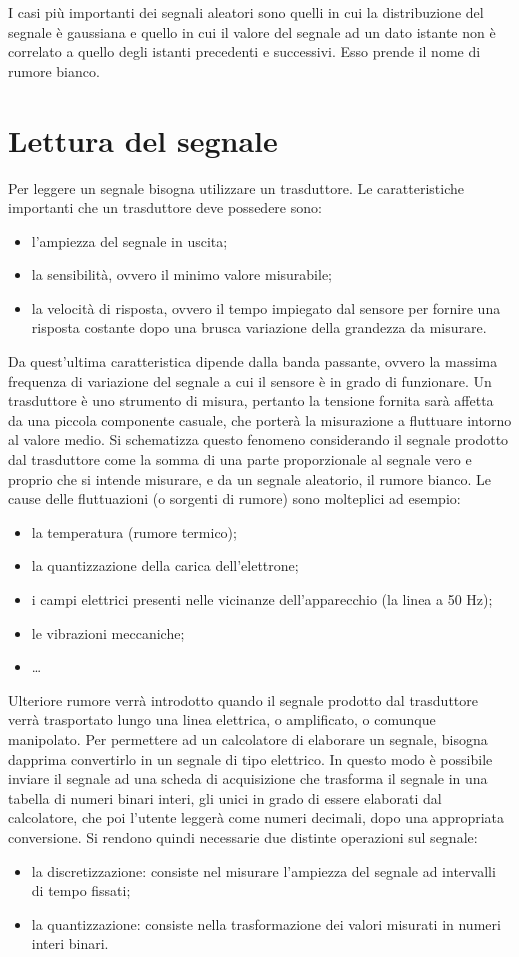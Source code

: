 \documentclass[a4paper,12pt]{article}
\begin{document}
I casi più importanti dei segnali aleatori sono quelli in cui la distribuzione del segnale è gaussiana e quello in cui il valore del segnale ad un dato istante non è correlato a quello degli istanti precedenti e successivi. Esso prende il nome di rumore bianco.

\section{Lettura del segnale}
Per leggere un segnale bisogna utilizzare un trasduttore. Le caratteristiche importanti che un trasduttore deve possedere sono:
\begin{itemize}
\item l'ampiezza del segnale in uscita;
\item la sensibilità, ovvero il minimo valore misurabile;
\item la velocità di risposta, ovvero il tempo impiegato dal sensore per fornire una risposta costante dopo una brusca variazione della grandezza da misurare.
\end{itemize}
Da quest'ultima caratteristica dipende dalla banda passante, ovvero la massima frequenza di variazione del segnale a cui il sensore è in grado di funzionare. 
Un trasduttore è uno strumento di misura, pertanto la tensione fornita sarà affetta da una piccola componente casuale, che porterà la misurazione a fluttuare intorno al valore medio. Si schematizza questo fenomeno considerando il segnale prodotto dal trasduttore come la somma di una parte proporzionale al segnale vero e proprio che si intende misurare, e da un segnale aleatorio, il rumore bianco. Le cause delle fluttuazioni (o sorgenti di rumore) sono molteplici ad esempio:
\begin{itemize}
\item la temperatura (rumore termico);
\item la quantizzazione della carica dell'elettrone;
\item i campi elettrici presenti nelle vicinanze dell'apparecchio (la linea a 50 Hz);
\item le vibrazioni meccaniche;
\item \dots
\end{itemize}
Ulteriore rumore verrà introdotto quando il segnale prodotto dal trasduttore verrà trasportato lungo una linea elettrica, o amplificato, o comunque manipolato. Per permettere ad un calcolatore di elaborare un segnale, bisogna dapprima convertirlo in un segnale di tipo elettrico. In questo modo è possibile inviare il segnale ad una scheda di acquisizione che trasforma il segnale in una tabella di numeri binari interi, gli unici in grado di essere elaborati dal calcolatore, che poi l'utente leggerà come numeri decimali, dopo una appropriata conversione. Si rendono quindi necessarie due distinte operazioni sul segnale: 
\begin{itemize}
\item la discretizzazione: consiste nel misurare l'ampiezza del segnale ad intervalli di tempo fissati;
\item la quantizzazione: consiste nella trasformazione dei valori misurati in numeri interi binari.
\end{itemize} 
\end{document}
